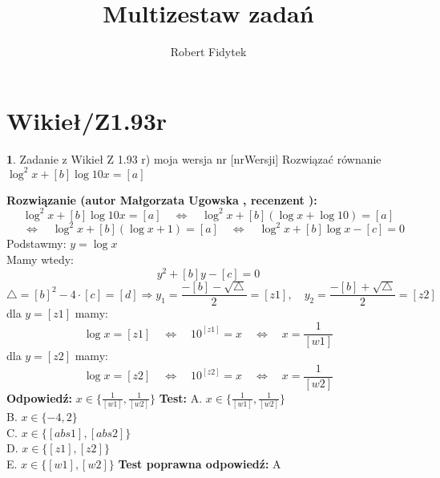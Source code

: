 \documentclass[12pt, a4paper]{article}
\title{Multizestaw zadań}
\author{Robert Fidytek}
\date{}
\theoremstyle{definition} %
\newtheorem{zad}{}
\newcommand{\kategoria}[1]{\section{#1}} %
\newcommand{\zadStart}[1]{\begin{zad}#1\newline} %
\newcommand{\zadStop}{\end{zad}}   %
\newcommand{\rozwStart}[2]{\noindent \textbf{Rozwiązanie (autor #1 , recenzent #2): }\newline} %
\newcommand{\rozwStop}{\newline}                                            %
\newcommand{\odpStart}{\noindent \textbf{Odpowiedź:}\newline}    %
\newcommand{\odpStop}{\newline}                                             %
\newcommand{\testStart}{\noindent \textbf{Test:}\newline} %
\newcommand{\testStop}{\newline} %
\newcommand{\kluczStart}{\noindent \textbf{Test poprawna odpowiedź:}\newline} %
\newcommand{\kluczStop}{\newline} %
\begin{document}
\maketitle


\kategoria{Wikieł/Z1.93r}
\zadStart{Zadanie z Wikieł Z 1.93 r) moja wersja nr [nrWersji]}
Rozwiązać równanie $\log^2{x}+[b]\log{10x} =[a]$
\zadStop
\rozwStart{Małgorzata Ugowska}{}
$$\log^2{x}+[b]\log{10x} =[a] \quad \Longleftrightarrow \quad \log^2{x}+[b](\log{x}+\log{10}) =[a] $$
$$ \quad \Longleftrightarrow \quad \log^2{x}+[b](\log{x}+1) =[a] \quad \Longleftrightarrow \quad \log^2{x}+[b]\log{x}-[c]=0$$
Podstawmy: $y=\log{x}$\\
Mamy wtedy:
$$y^2 +[b]y-[c]=0$$
$$ \bigtriangleup = [b]^2-4 \cdot [c] = [d] \Longrightarrow y_1=\frac{-[b]-\sqrt{\bigtriangleup}}{2} = [z1], \quad y_2=\frac{-[b]+\sqrt{\bigtriangleup}}{2} = [z2]$$
dla $y=[z1]$ mamy:
$$\log{x} = [z1] \quad \Longleftrightarrow \quad 10^{[z1]}=x \quad \Longleftrightarrow \quad x=\frac{1}{[w1]}$$
dla $y=[z2]$ mamy:
$$\log{x} = [z2] \quad \Longleftrightarrow \quad 10^{[z2]}=x \quad \Longleftrightarrow \quad x=\frac{1}{[w2]}$$
\rozwStop
\odpStart
$x \in \{\frac{1}{[w1]}, \frac{1}{[w2]}\}$
\odpStop
\testStart
A. $x \in \{\frac{1}{[w1]}, \frac{1}{[w2]}\}$\\
B. $x \in \{-4, 2\}$\\
C. $x \in \{[abs1], [abs2]\}$\\
D. $x \in \{[z1], [z2]\}$\\
E. $x \in \{[w1], [w2]\}$
\testStop
\kluczStart
A
\kluczStop
\end{document}
